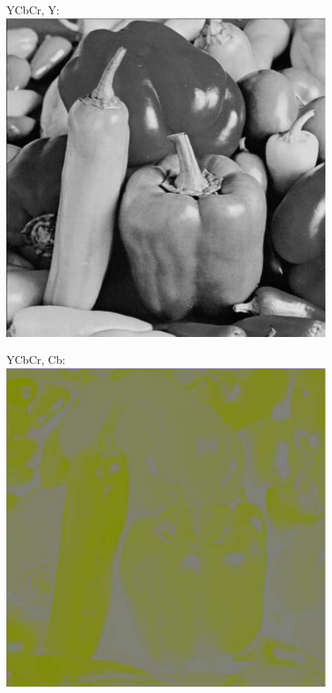 \documentclass[a4paper,USenglish]{lipics}
\begin{document}
\begin{figure}
\begin{minipage}[b]{0.33\textwidth}
YCbCr, Y:\\
\includegraphics[width=0.95\textwidth]{images/ycbcrY}
\end{minipage}%
\begin{minipage}[b]{0.33\textwidth}
YCbCr, Cb:\\
\includegraphics[width=0.95\textwidth]{images/ycbcrCr2}

\end{minipage}
\end{figure}
\end{document}
